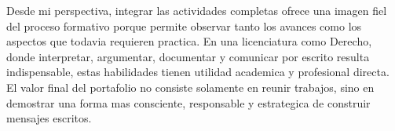 \documentclass[
	spanish,
	letterpaper, oneside
]{article}
\begin{document}
Desde mi perspectiva, integrar las actividades completas ofrece una imagen fiel del proceso formativo porque permite observar tanto los avances como los aspectos que todavia requieren practica. En una licenciatura como Derecho, donde interpretar, argumentar, documentar y comunicar por escrito resulta indispensable, estas habilidades tienen utilidad academica y profesional directa. El valor final del portafolio no consiste solamente en reunir trabajos, sino en demostrar una forma mas consciente, responsable y estrategica de construir mensajes escritos.

\clearpage


\end{document}
